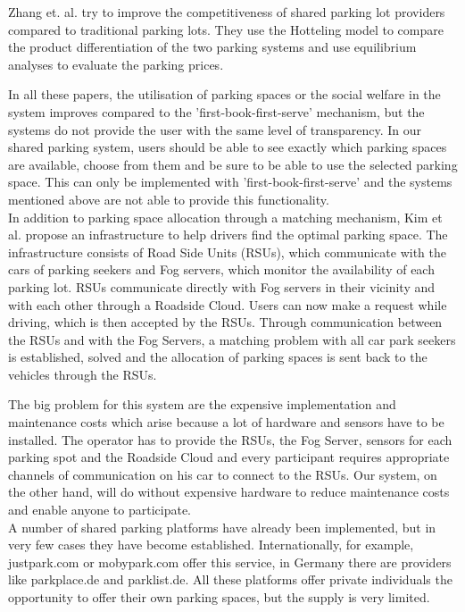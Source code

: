 \documentclass[
a4paper,     %
titlepage,   %
14pt         %
]{scrartcl}  %
\theoremstyle{mystyle}
\begin{document}
Zhang et. al. try to improve the competitiveness of shared parking lot providers compared to traditional parking lots. They use the Hotteling model to compare the product differentiation of the two parking systems and use equilibrium analyses to evaluate the parking prices. \cite{zhang2019pricing}

In all these papers, the utilisation of parking spaces or the social welfare in the system improves compared to the 'first-book-first-serve' mechanism, but the systems do not provide the user with the same level of transparency. In our shared parking system, users should be able to see exactly which parking spaces are available, choose from them and be sure to be able to use the selected parking space. This can only be implemented with 'first-book-first-serve' and the systems mentioned above are not able to provide this functionality.\\

In addition to parking space allocation through a matching mechanism, Kim et al. propose an infrastructure to help drivers find the optimal parking space. The infrastructure consists of Road Side Units (RSUs), which communicate with the cars of parking seekers and Fog servers, which monitor the availability of each parking lot. RSUs communicate directly with Fog servers in their vicinity and with each other through a Roadside Cloud. Users can now make a request while driving, which is then accepted by the RSUs. Through communication between the RSUs and with the Fog Servers, a matching problem with all car park seekers is established, solved and the allocation of parking spaces is sent back to the vehicles through the RSUs. \cite{Kim2015ASP}

The big problem for this system are the expensive implementation and maintenance costs which arise because a lot of hardware and sensors have to be installed. The operator has to provide the RSUs, the Fog Server, sensors for each parking spot and the Roadside Cloud and every participant requires appropriate channels of communication on his car to connect to the RSUs. Our system, on the other hand, will do without expensive hardware to reduce maintenance costs and enable anyone to participate.\\


A number of shared parking platforms have already been implemented, but in very few cases they have become established. Internationally, for example, justpark.com or mobypark.com offer this service, in Germany there are providers like parkplace.de and parklist.de. All these platforms offer private individuals the opportunity to offer their own parking spaces, but the supply is very limited.
\end{document}
